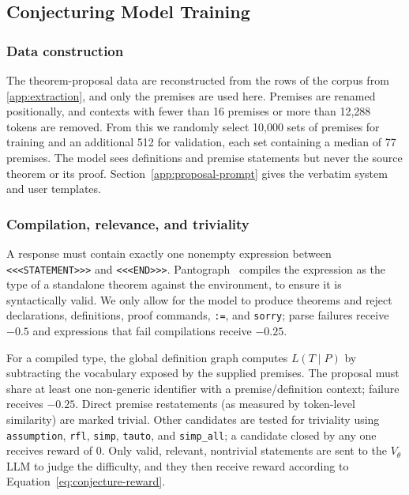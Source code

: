 \subsection{Conjecturing Model Training}
\label{app:forward-training}

\subsubsection{Data construction}

The theorem-proposal data are reconstructed from the  rows of the corpus from \ref{app:extraction}, and only the premises are used here.
Premises are renamed positionally, and contexts with fewer than 16 premises or more than 12,288 tokens are removed. 
From this we randomly select 10,000 sets of premises for training and an additional 512 for validation, each set containing a median of 77 premises.
The model sees definitions and premise statements but never the source theorem or its proof. 
Section~\ref{app:proposal-prompt} gives the verbatim system and user templates.

\subsubsection{Compilation, relevance, and triviality}

A response must contain exactly one nonempty expression between
\texttt{<<<STATEMENT>>>} and \texttt{<<<END>>>}. Pantograph~\citep{aniva2025pantograph} compiles the expression as the type of a standalone theorem against the \Mathlib
environment, to ensure it is syntactically valid. We only allow for the model to produce theorems and reject declarations, definitions, proof commands,
\texttt{:=}, and \texttt{sorry}; parse failures receive $-0.5$ and expressions
that fail compilations receive $-0.25$.

For a compiled type, the global definition graph computes
$L(T\mid P)$ by subtracting the vocabulary exposed by the supplied premises.
The proposal must share at least one non-generic identifier with a
premise/definition context; failure receives $-0.25$. Direct premise restatements (as measured by token-level similarity) are marked trivial. Other candidates are tested for triviality using \texttt{assumption}, \texttt{rfl}, \texttt{simp}, \texttt{tauto},
and \texttt{simp\_all}; a candidate closed by any one receives reward of $0$. Only valid,
relevant, nontrivial statements are sent to the $V_\theta$ LLM to judge the difficulty, and they then receive reward according to Equation~\ref{eq:conjecture-reward}.


